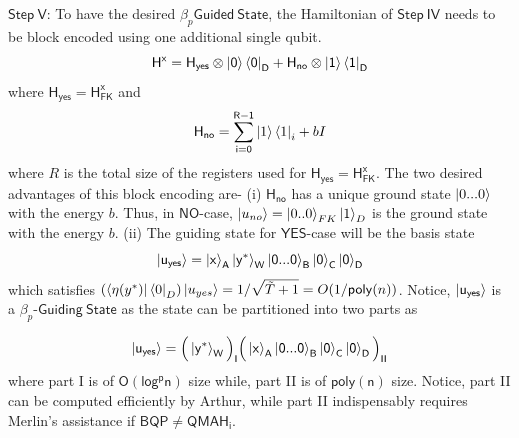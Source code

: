 \documentclass[11pt]{article}
\begin{document}
$\mathsf{Step\ V}$: To have the desired $\beta_p\mathsf{Guided\ State}$, the Hamiltonian of $\mathsf{Step\ IV}$ needs to be block encoded using one additional single qubit.
\begin{equation}
    \mathsf{H^x = H_{yes} \otimes \ket{0}\bra{0}_D + H_{no} \otimes \ket{1}\bra{1}_D}
\end{equation}
where $\mathsf{H_{yes} = H_{FK}^x}$ and
\begin{equation}\label{eqn:b-H_no}
    \mathsf{H_{no} = \sum_{i=0}^{R-1}}\ket{1}\bra{1}_i + bI 
\end{equation}
where $R$ is the total size of the registers used for  $\mathsf{H_{yes} = H_{FK}^x}$.
The two desired advantages of this block encoding are- \newline
(i) $\mathsf{H_{no}}$ has a unique ground state $\ket{0...0}$ with the energy $b$. Thus, in $\mathsf{NO}$-case,  $\ket{u_{no}} = \ket{0..0}_{FK}\ket{1}_D$ is the ground state with the energy $b$.\newline
(ii) The guiding state for $\mathsf{YES}$-case will be the basis state
\begin{equation}
    \mathsf{\ket{u_{yes}} = \ket{x}_A\ket{y^*}_W\ket{0...0}_B\ket{0}_C\ket{0}_D} 
\end{equation}
which satisfies $(\bra{\eta(y^*)}\bra{0}_D)\ket{u_{yes}}=1/\sqrt{\tilde{T}+1} = O(1/\mathsf{poly}(n))$. Notice, $\mathsf{\ket{u_{yes}}}$ is a $\beta_p$-$\mathsf{Guiding\ State}$ as the state can be partitioned into two parts as

\begin{equation}
    \mathsf{\ket{u_{yes}} = \Big(\ket{y^*}_W\Big)_I \Big(\ket{x}_A \ket{0...0}_B\ket{0}_C\ket{0}_D \Big)_{II}}
\end{equation}
where part I is of $\mathsf{O(log^p n)}$ size while, part II is of $\mathsf{poly(n)}$ size. Notice, part II can be computed efficiently by Arthur, while part II indispensably requires Merlin's assistance if $\mathsf{BQP \neq QMAH_i}$.\newline
\end{document}

